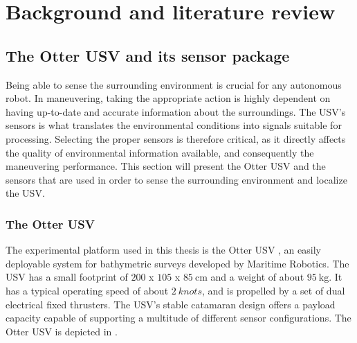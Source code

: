 
\chapter{Background and literature review}

\section{The Otter USV and its sensor package}

Being able to sense the surrounding environment is crucial for any autonomous robot. In maneuvering, taking the appropriate action is highly dependent on having up-to-date and accurate information about the surroundings. The USV's sensors is what translates the environmental conditions into signals suitable for processing. Selecting the proper sensors is therefore critical, as it directly affects the quality of environmental information available, and consequently the maneuvering performance. This section will present the Otter USV and the sensors that are used in order to sense the surrounding environment and localize the USV.

\subsection{The Otter USV}

The experimental platform used in this thesis is the Otter USV \citep{website:MR}, an easily deployable system for bathymetric surveys developed by Maritime Robotics. The USV has a small footprint of $200$ x $105$ x $\SI{85}{\cm}$ and a weight of about $\SI{95}{\kilogram}$. It has a typical operating speed of about $\SI{2}{knots}$, and is propelled by a set of dual electrical fixed thrusters. The USV's stable catamaran design offers a payload capacity capable of supporting a multitude of different sensor configurations. The Otter USV is depicted in . 

